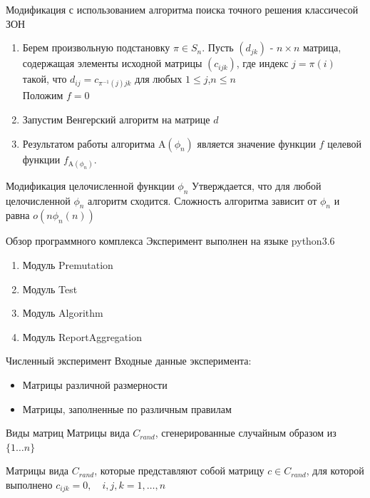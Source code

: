 \documentclass[12pt]{beamer}
\begin{document}
\begin{frame}{Модификация с использованием алгоритма поиска точного решения классичесой ЗОН}
\begin{enumerate}
\item Берем произвольную подстановку $\pi \in S_n$. Пусть $(d_{jk})$ - $n \times n$ 
матрица, содержащая элементы исходной матрицы $(c_{ijk})$, где индекс $j=\pi(i)$ такой, что
$
d_{ij} = c_{\pi^{-1}(j)jk}
$
для любых $1 \leq j$,$n \leq n$ \\
Положим $f = 0$
\item Запустим Венгерский алгоритм на матрице $d$ 
\item Результатом работы алгоритма $\mathrm{A}(\phi_n)$ является значение функции $f$ целевой функции   
$f_{\mathrm{A}(\phi_n)}$. 
\end{enumerate}
\end{frame}

\begin{frame}{Модификация целочисленной функции $\phi_n$}
Утверждается, что для любой целочисленной $\phi_n$ алгоритм сходится.
Сложность алгоритма зависит от $\phi_n$ и равна $o(n \phi_n(n) )$
\end{frame}

\begin{frame}{Обзор программного комплекса}
Эксперимент выполнен на языке python3.6

\begin{enumerate}
\item Модуль Premutation
\item Модуль Test
\item Модуль Algorithm
\item Модуль ReportAggregation
\end{enumerate}
\end{frame}

\begin{frame}{Численный эксперимент}
Входные данные эксперимента: 
\begin{itemize}
\item Матрицы различной размерности
\item Матрицы, заполненные по различным правилам
\end{itemize}
\end{frame}

\begin{frame}{Виды матриц}
Матрицы вида $C_{rand}$, сгенерированные случайным образом из~$\{ 1 \ldots n \}$

Матрицы вида $C_{rand}$, которые представляют собой матрицу $c \in C_{rand}$, 
для которой выполнено $c_{ijk} = 0,\quad i,j,k = 1, \ldots, n$

\end{frame}
\end{document}
